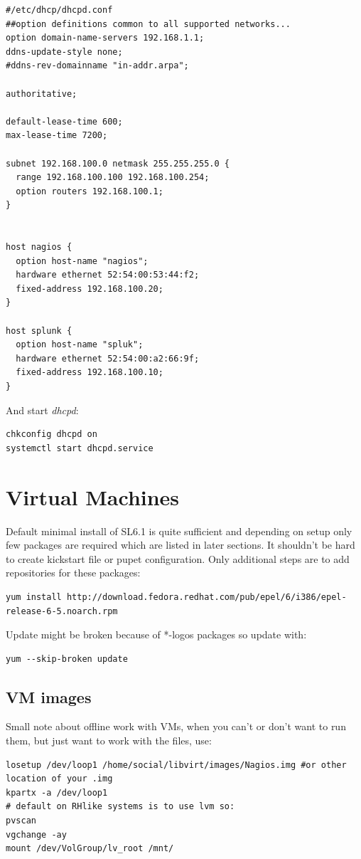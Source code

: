 \documentclass[10pt,a4paper,final]{report}
\begin{document}
\begin{lstlisting}
#/etc/dhcp/dhcpd.conf
##option definitions common to all supported networks...
option domain-name-servers 192.168.1.1;
ddns-update-style none;
#ddns-rev-domainname "in-addr.arpa";

authoritative;

default-lease-time 600;
max-lease-time 7200;

subnet 192.168.100.0 netmask 255.255.255.0 {
  range 192.168.100.100 192.168.100.254;
  option routers 192.168.100.1;
}


host nagios {
  option host-name "nagios";
  hardware ethernet 52:54:00:53:44:f2;
  fixed-address 192.168.100.20;
}

host splunk {
  option host-name "spluk";
  hardware ethernet 52:54:00:a2:66:9f;
  fixed-address 192.168.100.10;
}
\end{lstlisting}
And start \emph{dhcpd}:
\begin{lstlisting}
chkconfig dhcpd on
systemctl start dhcpd.service
\end{lstlisting}

\section{Virtual Machines}
Default minimal install of SL6.1 is quite sufficient and depending on setup only few packages are required which are listed in later sections. It shouldn't be hard to create kickstart file or pupet configuration. Only additional steps are to add repositories for these packages:
\begin{lstlisting}
yum install http://download.fedora.redhat.com/pub/epel/6/i386/epel-release-6-5.noarch.rpm
\end{lstlisting}
Update might be broken because of *-logos packages so update with:
\begin{lstlisting}
yum --skip-broken update
\end{lstlisting}
\subsection{VM images}
Small note about offline work with VMs, when you can't or don't want to run them, but just want to work with the files, use:
\begin{lstlisting}
losetup /dev/loop1 /home/social/libvirt/images/Nagios.img #or other location of your .img
kpartx -a /dev/loop1
# default on RHlike systems is to use lvm so:
pvscan
vgchange -ay
mount /dev/VolGroup/lv_root /mnt/
\end{lstlisting}
\end{document}
